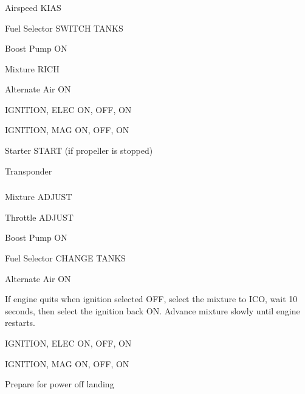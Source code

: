 \begin{multicols}{2}
\subsubsection*{}

\begin{enumerate*}
\item Airspeed  KIAS
\item Fuel Selector \dotfill SWITCH TANKS
\item Boost Pump \dotfill ON
\item Mixture \dotfill RICH
\item Alternate Air \dotfill ON
\item IGNITION, ELEC \dotfill ON, OFF, ON
\item IGNITION, MAG \dotfill ON, OFF, ON
\item Starter \dotfill START (if propeller is stopped)
\item Transponder
\end{enumerate*}

\subsubsection*{}

\begin{enumerate*}
\item Mixture \dotfill ADJUST
\item Throttle \dotfill ADJUST
\item Boost Pump \dotfill ON
\item Fuel Selector \dotfill CHANGE TANKS
\item Alternate Air \dotfill ON
\begin{Note}[CAUTION]
If engine quits when ignition selected OFF, select the mixture to ICO, wait 10 seconds, then select the ignition back ON.
Advance mixture slowly until engine restarts.
\end{Note}
\item IGNITION, ELEC \dotfill ON, OFF, ON
\item IGNITION, MAG \dotfill ON, OFF, ON
\item Prepare for power off landing
\end{enumerate*}


\end{multicols}
